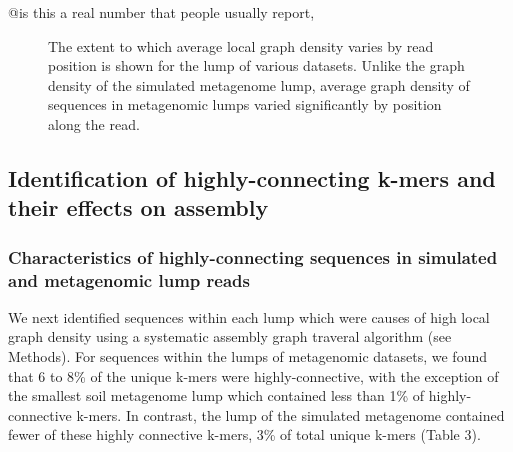 \documentclass[11pt]{article} %
\begin{document}
@is this a real number that people usually report, %

\begin{figure}
\caption{The extent to which average local graph density varies by read position is shown for the lump of various datasets.  Unlike the graph density of the simulated metagenome lump, average graph density of sequences in metagenomic lumps varied significantly by position along the read.}
\end{figure}

\subsection{Identification of highly-connecting k-mers and their effects on assembly}

\subsubsection{Characteristics of highly-connecting sequences in simulated and metagenomic lump reads}

We next identified sequences within each lump which were causes of high local graph density using a systematic assembly graph traveral algorithm (see Methods).  For sequences within the lumps of metagenomic datasets, we found that 6 to 8\% of the unique k-mers were highly-connective, with the exception of the smallest soil metagenome lump which contained less than 1\% of highly-connective k-mers.  In contrast, the lump of the simulated metagenome contained fewer of these highly connective k-mers, 3\% of total unique k-mers (Table 3).  
\end{document}
